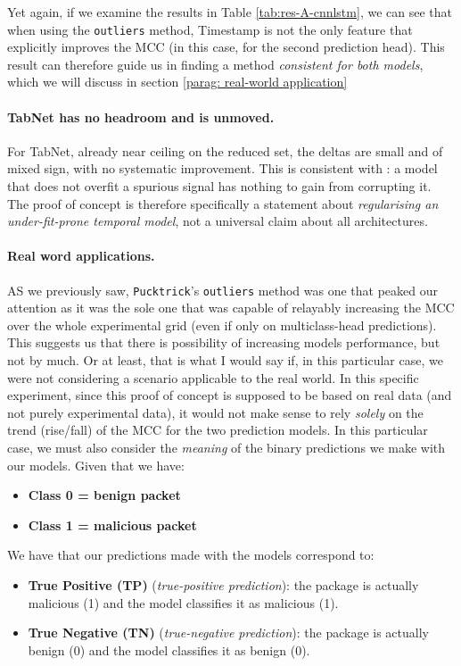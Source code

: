 \documentclass[../main.tex]{subfiles}
\begin{document}
Yet again, if we examine the results in Table \ref{tab:res-A-cnnlstm}, we can see that when using the \texttt{outliers} method, Timestamp is not the only feature that explicitly improves the MCC (in this case, for the second prediction head). This result can therefore guide us in finding a method \emph{consistent for both models}, which we will discuss in section \ref{parag: real-world application}

\paragraph{TabNet has no headroom and is unmoved.}
For TabNet, already near ceiling on the reduced set, the deltas are small and of mixed sign, with no systematic improvement. This is consistent with : a model that does not overfit a spurious signal has nothing to gain from corrupting it. The proof of concept is therefore specifically a statement about \emph{regularising an under-fit-prone temporal model}, not a universal claim about all architectures.


\paragraph{Real word applications.}
\label{parag: real word application}
AS we previously saw, \texttt{Pucktrick}'s \texttt{outliers} method was one that peaked our attention as it was the sole one that was capable of relayably increasing the MCC over the whole experimental grid (even if only on multiclass-head predictions). This suggests us that there is possibility of increasing models performance, but not by much. Or at least, that is what I would say if, in this particular case, we were not considering a scenario applicable to the real world. In this specific experiment, since this proof of concept is supposed to be based on real data (and not purely experimental data), it would not make sense to rely \emph{solely} on the trend (rise/fall) of the MCC for the two prediction models. In this particular case, we must also consider the \emph{meaning} of the binary predictions we make with our models. 
Given that we have:
\begin{itemize}
\tightlist
\item
  \textbf{Class 0 = benign packet}
\item
  \textbf{Class 1 = malicious packet}
\end{itemize}

We have that our predictions made with the models correspond to: 
\begin{itemize}
\item
  \textbf{True Positive (TP)} (\emph{true-positive prediction}): the
  package is actually malicious (1) and the model classifies it as
  malicious (1).
\item
  \textbf{True Negative (TN)} (\emph{true-negative prediction}): the
  package is actually benign (0) and the model classifies it as
  benign (0).
\end{itemize}
\end{document}
